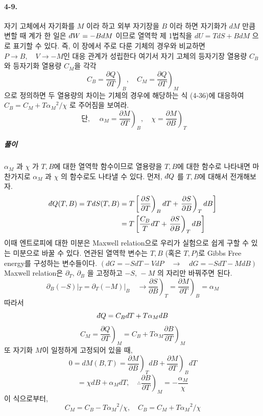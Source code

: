 \documentclass[a4paper,12pt]{report}
\newcommand{\Maxwell}[3][]{\left.\frac{\partial #2}{\partial #3} \right)_{#1} }
\newcommand{\dbar}{d\hspace*{-0.08em}\bar{}\hspace*{0.1em}}
\begin{document}
	 \paragraph{4-9. } 자기 고체에서 자기화를 $M$ 이라 하고 외부 자기장을 $B$ 이라 하면 자기화가 $dM$ 만큼 변할 때 계가 한 일은 $\dbar W=-BdM$ 이므로 열역학 제 1법칙을 $dU=TdS+BdM$ 으로 표기할 수 있다. 즉, 이 장에서 주로 다룬 기체의 경우와 비교하면 $P\rightarrow B,\quad V\rightarrow -M$인 대응 관계가 성립한다 여기서 자기 고체의 등자기장 열용량 $C_B$ 와 등자기화 열용량 $C_M$을 각각
	 $$C_B=\Maxwell[B]{Q}{T},\quad C_M=\Maxwell[M]{Q}{T}$$
	 으로 정의하면 두 열용량의 차이는 기체의 경우에 해당하는 식 (4-36)에 대응하여 $C_B=C_M+T{\alpha_M}^2/\chi$ 로 주어짐을 보여라. 
	 $$\mbox{ 단,  }\quad  \alpha_M=\Maxwell[B]{M}{T},\quad \chi=\Maxwell[T]{M}{B}$$
	 \subparagraph{풀이 } $\alpha_M$ 과 $\chi$ 가 $T,B$에 대한 열역학 함수이므로 열용량을 $T,B$에 대한 함수로 나타내면 마찬가지로 $\alpha_M$ 과 $\chi$ 의 함수로도 나타낼 수 있다. 먼저, $\dbar Q$ 를 $T,B$에 대해서 전개해보자. 
	 \begin{equation*}
	 	\begin{split}
	 	\dbar Q(T,B)=TdS(T,B)&=T\left[\Maxwell[B]{S}{T}dT+\Maxwell[T]{S}{B}dB \right]\\
	 	&=T\left[\frac{C_B}{T}dT+\Maxwell[T]{S}{B}dB \right]  
	 	\end{split}
	 \end{equation*}	
	 이때 엔트로피에 대한 미분은 Maxwell relation으로 우리가 실험으로 쉽게 구할 수 있는 미분으로 바꿀 수 있다. 연관된 열역학 변수는 $T,B$ (혹은 $T,P$)로 Gibbs Free energy를 구성하는 변수들이다. $(dG=-SdT-VdP\quad\rightarrow\quad dG=-SdT-MdB )$ Maxwell relation은 $\partial_T,\, \partial_B$ 을 고정하고 $-S,\,-M$ 의 자리만 바꿔주면 된다.
	 $$\partial_B(-S)|_T=\partial_T(-M)|_B\quad\rightarrow\Maxwell[T]{S}{B}=\Maxwell[B]{M}{T}=\alpha_M$$
	 따라서
	 $$\dbar Q=C_BdT+T\alpha_MdB$$
	 $$C_M=\Maxwell[M]{Q}{T}=C_B+T\alpha_M\Maxwell[M]{B}{T}$$
	 또 자기화 $M$이 일정하게 고정되어 있을 때,
	 $$0=dM(B,T)=\Maxwell[T]{M}{B}dB+\Maxwell[B]{M}{T}dT$$
	 $$=\chi dB+\alpha_MdT,\quad \therefore\Maxwell[M]{B}{T}=-\frac{\alpha_M}{\chi}$$
	 이 식으로부터,
	 $$C_M=C_B-T{\alpha_M}^2/\chi,\quad C_B=C_M+T{\alpha_M}^2/\chi$$
\end{document}
